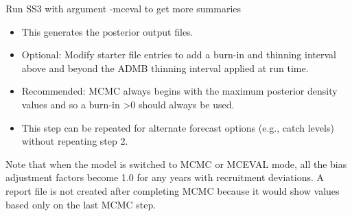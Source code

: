 \noindent Run SS3 with argument -mceval to get more summaries
\begin{itemize}
	\item This generates the posterior output files.
	\item Optional: Modify starter file entries to add a burn-in and thinning interval above and beyond the ADMB thinning interval applied at run time.
	\item Recommended: MCMC always begins with the maximum posterior density values and so a burn-in >0 should always be used.
	\item This step can be repeated for alternate forecast options (e.g., catch levels) without repeating step 2.
\end{itemize}

Note that when the model is switched to MCMC or MCEVAL mode, all the bias adjustment factors become 1.0 for any years with recruitment deviations. A report file is not created after completing MCMC because it would show values based only on the last MCMC step.

\pagebreak
